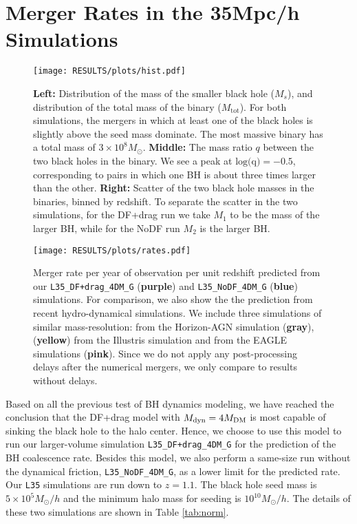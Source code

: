 \section{Merger Rates in the 35Mpc/h Simulations}
\label{sec:L35}

\begin{figure*}
\texttt{[image: RESULTS/plots/hist.pdf]}
\caption{ \textbf{Left:} Distribution of the mass of the smaller black hole ($M_s$), and distribution of the total mass of the binary ($M_{\mathrm{tot}}$). For both simulations, the mergers in which at least one of the black holes is slightly above the seed mass dominate. The most massive binary has a total mass of $3\times 10^8 M_\odot$. \textbf{Middle:} The mass ratio $q$ between the two black holes in the binary. We see a peak at $\text{log(q)}=-0.5$, corresponding to pairs in which one BH is about three times larger than the other. \textbf{Right:} Scatter of the two black hole masses in the binaries, binned by redshift. To separate the scatter in the two simulations, for the DF+drag run we take $M_1$ to be the mass of the larger BH, while for the NoDF run $M_2$ is the larger BH.}
\label{fig:hist}
\end{figure*}

\begin{figure}
\texttt{[image: RESULTS/plots/rates.pdf]}
\caption{Merger rate per year of observation per unit redshift predicted from our \texttt{L35\_DF+drag\_4DM\_G} (\textbf{purple}) and \texttt{L35\_NoDF\_4DM\_G} (\textbf{blue}) simulations. 
For comparison, we also show the the prediction from recent hydro-dynamical simulations. 
We include three simulations of similar mass-resolution: \citet{Volonteri2020} from the Horizon-AGN simulation (\textbf{gray}), \citet{Katz2020} (\textbf{yellow}) from the Illustris simulation and \citet{Salcido2016} from the EAGLE simulations (\textbf{pink}).
Since we do not apply any post-processing delays after the numerical mergers, we only compare to results without delays.}
\label{fig:rates}
\end{figure}

Based on all the previous test of BH dynamics modeling, we have reached the conclusion that the DF+drag model with $M_{\rm dyn} = 4 M_{\rm DM}$ is most capable of sinking the black hole to the halo center. Hence, we choose to use this model to run our larger-volume simulation \texttt{L35\_DF+drag\_4DM\_G} for the prediction of the BH coalescence rate. Besides this model, we also perform a same-size run without the dynamical friction, \texttt{L35\_NoDF\_4DM\_G}, as a lower limit for the predicted rate.  
Our \texttt{L35} simulations are run down to $z=1.1$. The black hole seed mass is $5\times10^5 M_\odot/h$ and the minimum halo mass for seeding is $10^{10} M_\odot/h$. The details of these two simulations are shown in Table \ref{tab:norm}.

